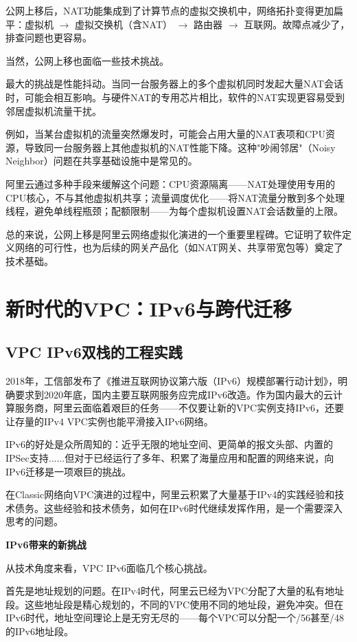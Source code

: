 公网上移后，NAT功能集成到了计算节点的虚拟交换机中，网络拓扑变得更加扁平：虚拟机 $\rightarrow$ 虚拟交换机（含NAT） $\rightarrow$ 路由器 $\rightarrow$ 互联网。故障点减少了，排查问题也更容易。

当然，公网上移也面临一些技术挑战。

最大的挑战是性能抖动。当同一台服务器上的多个虚拟机同时发起大量NAT会话时，可能会相互影响。与硬件NAT的专用芯片相比，软件的NAT实现更容易受到邻居虚拟机流量干扰。

例如，当某台虚拟机的流量突然爆发时，可能会占用大量的NAT表项和CPU资源，导致同一台服务器上其他虚拟机的NAT性能下降。这种"吵闹邻居"（Noisy Neighbor）问题在共享基础设施中是常见的。

阿里云通过多种手段来缓解这个问题：CPU资源隔离——NAT处理使用专用的CPU核心，不与其他虚拟机共享；流量调度优化——将NAT流量分散到多个处理线程，避免单线程瓶颈；配额限制——为每个虚拟机设置NAT会话数量的上限。

总的来说，公网上移是阿里云网络虚拟化演进的一个重要里程碑。它证明了软件定义网络的可行性，也为后续的网关产品化（如NAT网关、共享带宽包等）奠定了技术基础。

\section{新时代的VPC：IPv6与跨代迁移}

\subsection{VPC IPv6双栈的工程实践}

2018年，工信部发布了《推进互联网协议第六版（IPv6）规模部署行动计划》，明确要求到2020年底，国内主要互联网服务应完成IPv6改造。作为国内最大的云计算服务商，阿里云面临着艰巨的任务——不仅要让新的VPC实例支持IPv6，还要让存量的IPv4 VPC实例也能平滑接入IPv6网络。

IPv6的好处是众所周知的：近乎无限的地址空间、更简单的报文头部、内置的IPSec支持......但对于已经运行了多年、积累了海量应用和配置的网络来说，向IPv6迁移是一项艰巨的挑战。

在Classic网络向VPC演进的过程中，阿里云积累了大量基于IPv4的实践经验和技术债务。这些经验和技术债务，如何在IPv6时代继续发挥作用，是一个需要深入思考的问题。

\textbf{IPv6带来的新挑战}

从技术角度来看，VPC IPv6面临几个核心挑战。

首先是地址规划的问题。在IPv4时代，阿里云已经为VPC分配了大量的私有地址段。这些地址段是精心规划的，不同的VPC使用不同的地址段，避免冲突。但在IPv6时代，地址空间理论上是无穷无尽的——每个VPC可以分配一个/56甚至/48的IPv6地址段。


